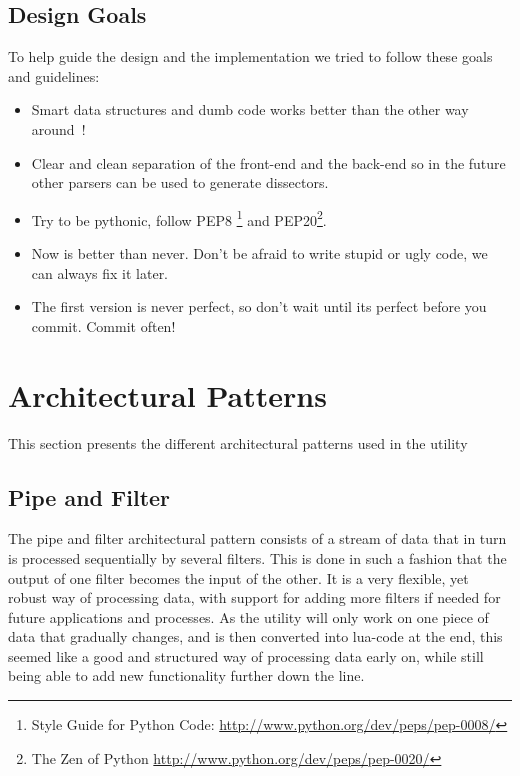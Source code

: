 \subsection{Design Goals}
To help guide the design and the implementation we tried to follow these goals and guidelines:
\begin{itemize}
	\item Smart data structures and dumb code works better than the other way around~\cite{Raymond1999}!
	\item Clear and clean separation of the front-end and the back-end so in the future other parsers can be used to generate \glspl{dissector}.
	\item Try to be pythonic, follow  PEP8 \footnote{Style Guide for Python Code: \url{http://www.python.org/dev/peps/pep-0008/}} and PEP20\footnote{The Zen of Python \url{http://www.python.org/dev/peps/pep-0020/}}.
	\item Now is better than never. Don't be afraid to write stupid or ugly code, we can always fix it later.
	\item The first version is never perfect, so don't wait until its perfect before you commit. Commit often!
\end{itemize}

\section{Architectural Patterns}
This section presents the different architectural patterns used in the \gls{utility}

\subsection{Pipe and Filter}
The pipe and filter architectural pattern consists of a stream of data that in turn is processed sequentially by several filters. This is done in such a fashion that the output of one filter becomes the input of the other. It is a very flexible, yet robust way of processing data, with support for adding more filters if needed for future applications and processes. As the \gls{utility} will only work on one piece of data that gradually changes, and is then converted into \Gls{lua}-code at the end, this seemed like a good and structured way of processing data early on, while still being able to add new functionality further down the line.

